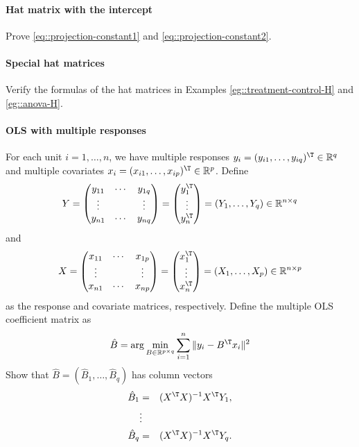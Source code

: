 \paragraph{Hat matrix with the intercept}\label{hw03::hat-matrix-intercept}


Prove \eqref{eq::projection-constant1} and \eqref{eq::projection-constant2}. 


\paragraph{Special hat matrices}\label{hw03::special-H}

Verify the formulas of the hat matrices in Examples \ref{eg::treatment-control-H} and \ref{eg::anova-H}. 




\paragraph{OLS with multiple responses}
\label{hw03::multiple-responses}
 
For each unit $i=1,\ldots, n$, we have multiple responses
$y_i=(y_{i1},\ldots, y_{iq})^{\T}   \in \mathbb{R}^q  $ and multiple covariates $x_i=(x_{i1}, \ldots,x_{ip})^{\T}   \in \mathbb{R}^p $. Define
$$
Y =\begin{pmatrix}
y_{11} &\cdots & y_{1q} \\
\vdots & & \vdots \\
y_{n1} & \cdots & y_{nq}
\end{pmatrix} = \begin{pmatrix}
y_{1}^{\T} \\
\vdots \\
y_{n}^{\T}
\end{pmatrix} 
= (Y_1,\ldots,Y_q) 
\in \mathbb{R}^{n\times q}
$$
and
$$
X = \begin{pmatrix}
x_{11} &\cdots & x_{1p} \\
\vdots & & \vdots \\
x_{n1} & \cdots & x_{np}
\end{pmatrix} = \begin{pmatrix}
x_{1}^{\T} \\
\vdots \\
x_{n}^{\T}
\end{pmatrix} 
= (X_1,\ldots,X_p)
\in \mathbb{R}^{n\times p}
$$
as the response and covariate matrices, respectively. Define the multiple OLS coefficient matrix as
\[ \hat{B} = \arg\min_{B \in \mathbb{R}^{p \times q}}\sum_{i=1}^n \| y_i-B^{\T}x_i \|^2 \]
Show that
$
\hat{B} =(
\hat{B}_1, 
\ldots, 
\hat{B}_q 
)
$
has column vectors 
\begin{eqnarray*}
\hat{B}_1 &=& (X^{\T}  X)^{-1}X^{\T}  Y_1 ,\\
 &\vdots & \\ 
\hat{B}_q &=&(X^{\T}  X)^{-1}X^{\T} Y_q.
\end{eqnarray*}



